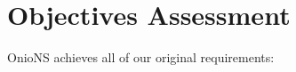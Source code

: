 \documentclass{sig-alternate}
\begin{document}







\section{Objectives Assessment}

OnioNS achieves all of our original requirements:
\end{document}
